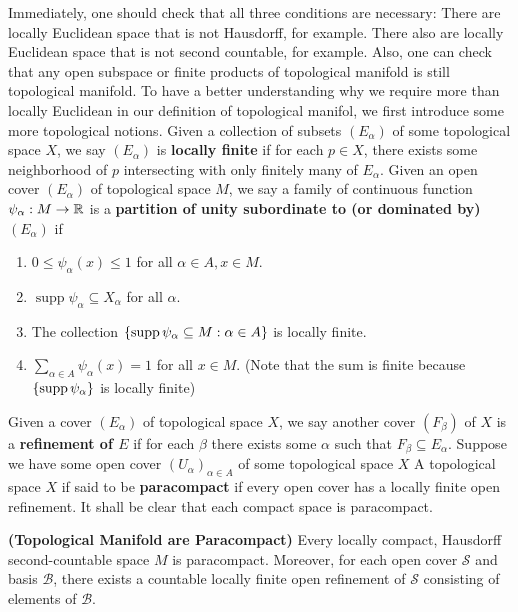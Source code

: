 \documentclass{report}
\begin{document}
\begin{mdframed}
Immediately, one should check that all three conditions are necessary: There are locally Euclidean space that is not Hausdorff,  for example. There also are locally Euclidean space that is not second countable,  for example. Also, one can check that any open subspace or finite products of topological manifold is still topological manifold. To have a better understanding why we require more than locally Euclidean in our definition of topological manifol, we first introduce some more topological notions. Given a collection of subsets $(E_\alpha )$ of some topological space $X$, we say $(E_\alpha )$ is \textbf{locally finite} if for each $p \in X$, there exists some neighborhood of $p$ intersecting with only finitely many of $E_\alpha $. Given an open cover $(E_\alpha )$ of topological space $M$, we say a family of continuous function  $\psi_\alpha :M\rightarrow \mathbb{R}$ is a \textbf{partition of unity subordinate to (or dominated by) $(E_\alpha )$} if 
\begin{enumerate}[label=(\roman*)]
  \item $0\leq \psi_\alpha  (x)\leq 1$ for all $\alpha \in A,x\in M$. 
  \item $\operatorname{supp}\psi_\alpha  \subseteq X_\alpha $ for all $\alpha $. 
  \item The collection $\{ \operatorname{supp}\psi_\alpha \subseteq M:\alpha \in A \}$ is locally finite.
  \item  $\sum_{\alpha \in A}\psi_\alpha (x)=1$ for all $x\in M$. (Note that the sum is finite because $\{ \operatorname{supp}\psi_\alpha \}$ is locally finite)
\end{enumerate}


Given a cover $(E_\alpha )$ of topological space $X$, we say another cover $(F_\beta  )$ of $X$ is a  \textbf{refinement of $E$} if for each $\beta $ there exists some $\alpha $ such that $F_\beta  \subseteq E_\alpha $. Suppose we have some open cover $(U_\alpha )_{\alpha  \in A}$ of some topological space $X$    
 A topological space $X$ if said to be \textbf{paracompact} if every open cover has a locally finite open refinement. It shall be clear that each compact space is paracompact.
\end{mdframed}
\begin{theorem}
\label{Topological Manifold are Paracompact}
\textbf{(Topological Manifold are Paracompact)} Every locally compact, Hausdorff second-countable space $M$ is paracompact. Moreover, for each open cover $\mathcal{S}$ and basis $\mathcal{B}$, there exists a countable locally finite open refinement of $\mathcal{S}$ consisting of elements of $\mathcal{B}$.  
\end{theorem}
\end{document}

